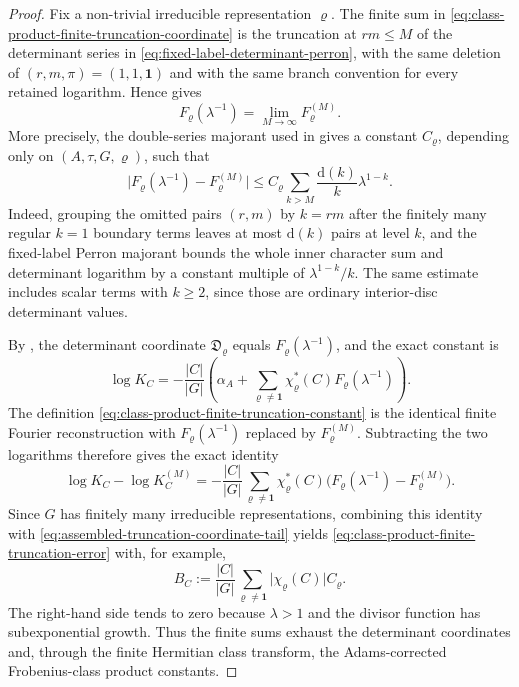 \documentclass[11pt,a4paper]{amsart}
\theoremstyle{plain}
\theoremstyle{definition}
\theoremstyle{remark}
\newcommand{\abs}[1]{\lvert #1 \rvert}
\begin{document}
\begin{proof}
  Fix a non-trivial irreducible representation \(\varrho\).  The finite sum
  in \eqref{eq:class-product-finite-truncation-coordinate} is the truncation
  at \(rm\le M\) of the determinant series in
  \eqref{eq:fixed-label-determinant-perron}, with the same deletion of
  \((r,m,\pi)=(1,1,\mathbf1)\) and with the same branch convention for every
  retained logarithm.  Hence 
  gives
  \[
    F_\varrho(\lambda^{-1})
    =\lim_{M\to\infty}F^{(M)}_\varrho .
  \]
  More precisely, the double-series majorant used in
   gives a constant
  \(C_\varrho\), depending only on \((A,\tau,G,\varrho)\), such that
  \begin{equation}\label{eq:assembled-truncation-coordinate-tail}
    \abs{F_\varrho(\lambda^{-1})-F^{(M)}_\varrho}
    \le
    C_\varrho
    \sum_{k>M}\frac{\mathrm d(k)}{k}\lambda^{1-k}.
  \end{equation}
  Indeed, grouping the omitted pairs \((r,m)\) by \(k=rm\) after the
  finitely many regular \(k=1\) boundary terms leaves at most
  \(\mathrm d(k)\) pairs at level \(k\), and the fixed-label Perron majorant
  bounds the whole inner character sum and determinant logarithm by a
  constant multiple of \(\lambda^{1-k}/k\).  The same estimate includes
  scalar terms with \(k\ge2\), since those are ordinary interior-disc
  determinant values.

  By , the determinant
  coordinate \(\mathfrak D_\varrho\) equals
  \(F_\varrho(\lambda^{-1})\), and the exact constant is
  \[
    \log K_C
    =-
    \frac{|C|}{|G|}
      \left(
        \alpha_A+
        \sum_{\varrho\ne\mathbf1}
          \chi_\varrho^\ast(C)F_\varrho(\lambda^{-1})
      \right).
  \]
  The definition \eqref{eq:class-product-finite-truncation-constant} is the
  identical finite Fourier reconstruction with
  \(F_\varrho(\lambda^{-1})\) replaced by \(F^{(M)}_\varrho\).  Subtracting
  the two logarithms therefore gives the exact identity
  \[
    \log K_C-\log K_C^{(M)}
    =-
    \frac{|C|}{|G|}
      \sum_{\varrho\ne\mathbf1}
        \chi_\varrho^\ast(C)
        \bigl(F_\varrho(\lambda^{-1})-F^{(M)}_\varrho\bigr).
  \]
  Since \(G\) has finitely many irreducible representations, combining this
  identity with \eqref{eq:assembled-truncation-coordinate-tail} yields
  \eqref{eq:class-product-finite-truncation-error} with, for example,
  \[
    B_C:=
    \frac{|C|}{|G|}
    \sum_{\varrho\ne\mathbf1}
      \abs{\chi_\varrho(C)}C_\varrho .
  \]
  The right-hand side tends to zero because \(\lambda>1\) and the divisor
  function has subexponential growth.  Thus the finite sums exhaust the
  determinant coordinates and, through the finite Hermitian class transform,
  the Adams-corrected Frobenius-class product constants.
\end{proof}
\end{document}
